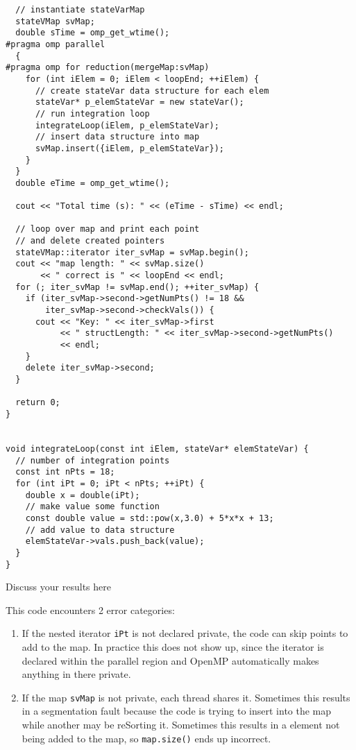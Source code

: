 \documentclass[11pt]{article}
\begin{document}
\begin{verbatim}
  // instantiate stateVarMap
  stateVMap svMap;
  double sTime = omp_get_wtime();
#pragma omp parallel
  {
#pragma omp for reduction(mergeMap:svMap)
    for (int iElem = 0; iElem < loopEnd; ++iElem) {
      // create stateVar data structure for each elem
      stateVar* p_elemStateVar = new stateVar();
      // run integration loop
      integrateLoop(iElem, p_elemStateVar);
      // insert data structure into map
      svMap.insert({iElem, p_elemStateVar});
    }
  }
  double eTime = omp_get_wtime();

  cout << "Total time (s): " << (eTime - sTime) << endl;

  // loop over map and print each point
  // and delete created pointers
  stateVMap::iterator iter_svMap = svMap.begin();
  cout << "map length: " << svMap.size()
       << " correct is " << loopEnd << endl;
  for (; iter_svMap != svMap.end(); ++iter_svMap) {
    if (iter_svMap->second->getNumPts() != 18 &&
        iter_svMap->second->checkVals()) {
      cout << "Key: " << iter_svMap->first
           << " structLength: " << iter_svMap->second->getNumPts()
           << endl;
    } 
    delete iter_svMap->second;
  }

  return 0;
}


void integrateLoop(const int iElem, stateVar* elemStateVar) {
  // number of integration points
  const int nPts = 18;
  for (int iPt = 0; iPt < nPts; ++iPt) {
    double x = double(iPt);
    // make value some function
    const double value = std::pow(x,3.0) + 5*x*x + 13;
    // add value to data structure
    elemStateVar->vals.push_back(value);
  }
} 
\end{verbatim}

Discuss your results here

This code encounters 2 error categories:
\begin{enumerate}
\item If the nested iterator \texttt{iPt} is not declared private, the code can
skip points to add to the map. In practice this does not show
up, since the iterator is declared within the parallel region and
OpenMP automatically makes anything in there private.
\item If the map \texttt{svMap} is not private, each thread shares it. Sometimes
this results in a segmentation fault because the code is trying to
insert into the map while another may be reSorting it. Sometimes
this results in a element not being added to the map, so \texttt{map.size()}
ends up incorrect.
\end{enumerate}
\end{document}
